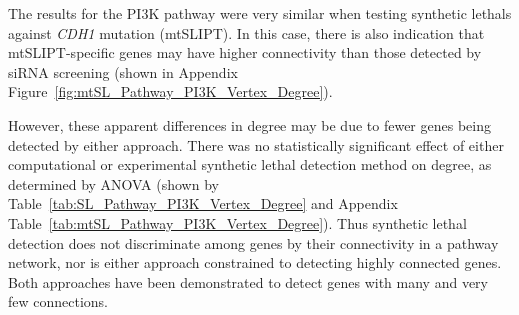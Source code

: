 \begin{table*}[!htb]
\caption{\acrshort{ANOVA} for synthetic lethality and vertex degree}
\label{tab:SL_Pathway_PI3K_Vertex_Degree}
\noindent{}
\end{table*} \filbreak

The results for the PI3K pathway were very similar when testing \glspl{synthetic lethal} against \textit{CDH1} \gls{mutation} (\acrshort{mtSLIPT}). In this case, there is also indication that \acrshort{mtSLIPT}-specific genes may have higher connectivity than those detected by \gls{siRNA} screening (shown in Appendix Figure~\ref{fig:mtSL_Pathway_PI3K_Vertex_Degree}).

However, these apparent differences in  degree may be due to fewer genes being detected by either approach. There was no statistically significant effect of either computational or experimental \gls{synthetic lethal} detection method on  degree, as determined by \gls{ANOVA} (shown by Table~\ref{tab:SL_Pathway_PI3K_Vertex_Degree} and Appendix Table~\ref{tab:mtSL_Pathway_PI3K_Vertex_Degree}). Thus \gls{synthetic lethal} detection does not discriminate among genes by their connectivity in a pathway network, nor is either approach constrained to detecting highly connected genes. Both approaches have been demonstrated to detect genes with many and very few connections.

